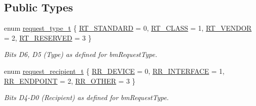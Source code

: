 \subsection*{Public Types}
\begin{DoxyCompactItemize}
\item 
enum \hyperlink{classmdt_frame_usb_control_a779262a63280a282343ada50acfda3d3}{request\_\-type\_\-t} \{ \hyperlink{classmdt_frame_usb_control_a779262a63280a282343ada50acfda3d3a8c6c5627c271ba79f4b5d0dc95f2e346}{RT\_\-STANDARD} =  0, 
\hyperlink{classmdt_frame_usb_control_a779262a63280a282343ada50acfda3d3acb67765c47b1662721a5149a8945a284}{RT\_\-CLASS} =  1, 
\hyperlink{classmdt_frame_usb_control_a779262a63280a282343ada50acfda3d3a39a9a2699cdcffce3c4e2d780b685506}{RT\_\-VENDOR} =  2, 
\hyperlink{classmdt_frame_usb_control_a779262a63280a282343ada50acfda3d3a93e912c92763c97407b901e4b8955a8b}{RT\_\-RESERVED} =  3
 \}
\begin{DoxyCompactList}\small\item\em Bits D6, D5 (Type) as defined for bmRequestType. \end{DoxyCompactList}\item 
enum \hyperlink{classmdt_frame_usb_control_aaf1f08b1b5e47ab18426800ed0accbde}{request\_\-recipient\_\-t} \{ \hyperlink{classmdt_frame_usb_control_aaf1f08b1b5e47ab18426800ed0accbdea136b8821e8efb19c3ccce9998a35f674}{RR\_\-DEVICE} =  0, 
\hyperlink{classmdt_frame_usb_control_aaf1f08b1b5e47ab18426800ed0accbdeab1e676c2884ded9bfd7e3035313b6c13}{RR\_\-INTERFACE} =  1, 
\hyperlink{classmdt_frame_usb_control_aaf1f08b1b5e47ab18426800ed0accbdea6ad7a0ecd11b108658cbd56d88280913}{RR\_\-ENDPOINT} =  2, 
\hyperlink{classmdt_frame_usb_control_aaf1f08b1b5e47ab18426800ed0accbdea21a5f8a556b34b336f7a31032df7d721}{RR\_\-OTHER} =  3
 \}
\begin{DoxyCompactList}\small\item\em Bits D4-\/D0 (Recipient) as defined for bmRequestType. \end{DoxyCompactList}\end{DoxyCompactItemize}
